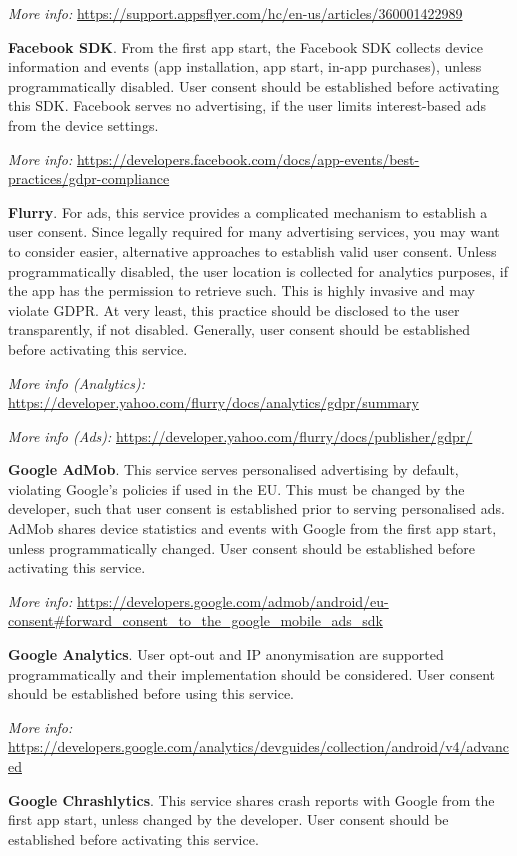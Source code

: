 \documentclass[
]{book}
\begin{document}
\emph{More info:} \url{https://support.appsflyer.com/hc/en-us/articles/360001422989}

\textbf{Facebook SDK}. From the first app start, the Facebook SDK collects device information and events (app installation, app start, in-app purchases), unless programmatically disabled. User consent should be established before activating this SDK. Facebook serves no advertising, if the user limits interest-based ads from the device settings.

\emph{More info:} \url{https://developers.facebook.com/docs/app-events/best-practices/gdpr-compliance}

\textbf{Flurry}. For ads, this service provides a complicated mechanism to establish a user consent. Since legally required for many advertising services, you may want to consider easier, alternative approaches to establish valid user consent. Unless programmatically disabled, the user location is collected for analytics purposes, if the app has the permission to retrieve such. This is highly invasive and may violate GDPR. At very least, this practice should be disclosed to the user transparently, if not disabled. Generally, user consent should be established before activating this service.

\emph{More info (Analytics):} \url{https://developer.yahoo.com/flurry/docs/analytics/gdpr/summary}

\emph{More info (Ads):} \url{https://developer.yahoo.com/flurry/docs/publisher/gdpr/}

\textbf{Google AdMob}. This service serves personalised advertising by default, violating Google's policies if used in the EU. This must be changed by the developer, such that user consent is established prior to serving personalised ads. AdMob shares device statistics and events with Google from the first app start, unless programmatically changed. User consent should be established before activating this service.

\emph{More info:} \url{https://developers.google.com/admob/android/eu-consent\#forward_consent_to_the_google_mobile_ads_sdk}

\textbf{Google Analytics}. User opt-out and IP anonymisation are supported programmatically and their implementation should be considered. User consent should be established before using this service.

\emph{More info:} \url{https://developers.google.com/analytics/devguides/collection/android/v4/advanced}

\textbf{Google Chrashlytics}. This service shares crash reports with Google from the first app start, unless changed by the developer. User consent should be established before activating this service.
\end{document}

